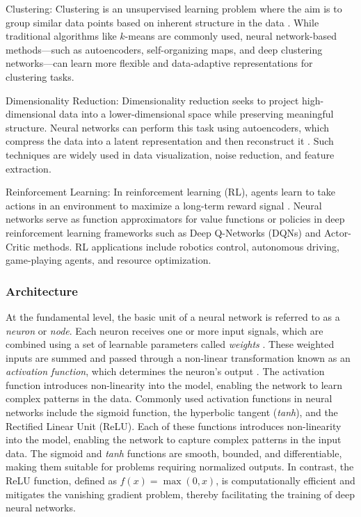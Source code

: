 Clustering: Clustering is an unsupervised learning problem where the aim is to group similar data points based on inherent structure in the data \parencite{aljalbout2018clustering}. While traditional algorithms like $k$-means are commonly used, neural network-based methods—such as autoencoders, self-organizing maps, and deep clustering networks—can learn more flexible and data-adaptive representations for clustering tasks.

Dimensionality Reduction: Dimensionality reduction seeks to project high-dimensional data into a lower-dimensional space while preserving meaningful structure. Neural networks can perform this task using autoencoders, which compress the data into a latent representation and then reconstruct it \parencite{hinton2006dimensionalityreduction}. Such techniques are widely used in data visualization, noise reduction, and feature extraction.

Reinforcement Learning: In reinforcement learning (RL), agents learn to take actions in an environment to maximize a long-term reward signal \parencite[pp.~2--3]{sutton2015reinforcement}. Neural networks serve as function approximators for value functions or policies in deep reinforcement learning frameworks such as Deep Q-Networks (DQNs) and Actor-Critic methods. RL applications include robotics control, autonomous driving, game-playing agents, and resource optimization.

\subsubsection{Architecture}
At the fundamental level, the basic unit of a neural network is referred to as a \textit{neuron} or \textit{node}. Each neuron receives one or more input signals, which are combined using a set of learnable parameters called \textit{weights} \parencite[p.~4]{mienye2024nncomprehensivereview}. These weighted inputs are summed and passed through a non-linear transformation known as an \textit{activation function}, which determines the neuron's output \parencite[pp.~4--5]{mienye2024nncomprehensivereview}. The activation function introduces non-linearity into the model, enabling the network to learn complex patterns in the data. Commonly used activation functions in neural networks include the sigmoid function, the hyperbolic tangent (\textit{tanh}), and the Rectified Linear Unit (ReLU). Each of these functions introduces non-linearity into the model, enabling the network to capture complex patterns in the input data. The sigmoid and \textit{tanh} functions are smooth, bounded, and differentiable, making them suitable for problems requiring normalized outputs. In contrast, the ReLU function, defined as $f(x) = \max(0, x)$, is computationally efficient and mitigates the vanishing gradient problem, thereby facilitating the training of deep neural networks.

